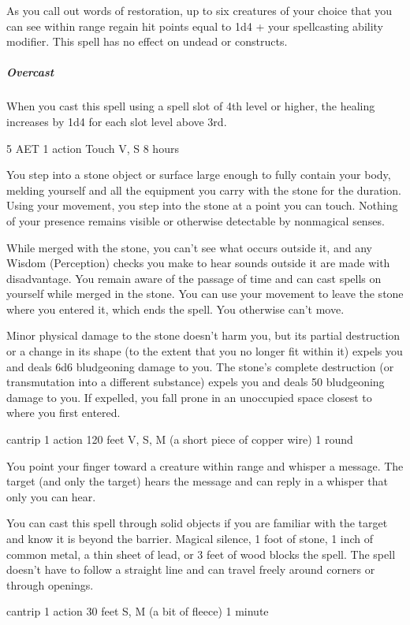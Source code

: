 As you call out words of restoration, up to six creatures of your choice that you can see within range regain hit points equal to 1d4 + your spellcasting ability modifier. This spell has no effect on undead or constructs.
\subparagraph*{Overcast} When you cast this spell using a spell slot of 4th level or higher, the healing increases by 1d4 for each slot level above 3rd.

\label{spell:meld-into-stone}
{5 AET}
{1 action}
{Touch}
{V, S}
{8 hours}

You step into a stone object or surface large enough to fully contain your body, melding yourself and all the equipment you carry with the stone for the duration. Using your movement, you step into the stone at a point you can touch. Nothing of your presence remains visible or otherwise detectable by nonmagical senses.

While merged with the stone, you can't see what occurs outside it, and any Wisdom (Perception) checks you make to hear sounds outside it are made with disadvantage. You remain aware of the passage of time and can cast spells on yourself while merged in the stone. You can use your movement to leave the stone where you entered it, which ends the spell. You otherwise can't move.

Minor physical damage to the stone doesn't harm you, but its partial destruction or a change in its shape (to the extent that you no longer fit within it) expels you and deals 6d6 bludgeoning damage to you. The stone's complete destruction (or transmutation into a different substance) expels you and deals 50 bludgeoning damage to you. If expelled, you fall prone in an unoccupied space closest to where you first entered.

\label{spell:message}
{cantrip}
{1 action}
{120 feet}
{V, S, M (a short piece of copper wire)}
{1 round}

You point your finger toward a creature within range and whisper a message. The target (and only the target) hears the message and can reply in a whisper that only you can hear.

You can cast this spell through solid objects if you are familiar with the target and know it is beyond the barrier. Magical silence, 1 foot of stone, 1 inch of common metal, a thin sheet of lead, or 3 feet of wood blocks the spell. The spell doesn't have to follow a straight line and can travel freely around corners or through openings.

\label{spell:minor-illusion}
{cantrip}
{1 action}
{30 feet}
{S, M (a bit of fleece)}
{1 minute}

